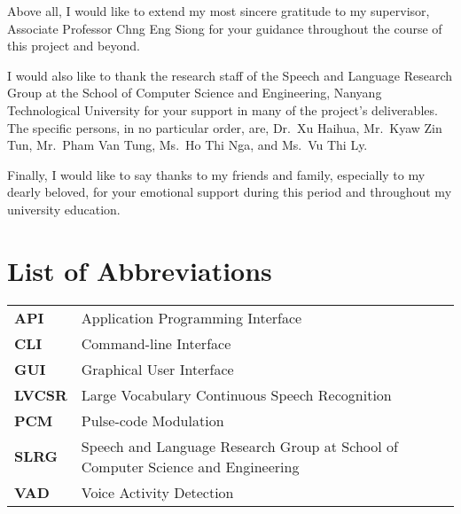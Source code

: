 Above all, I would like to extend my most sincere gratitude to my supervisor,
Associate Professor Chng Eng Siong for your guidance throughout
the course of this project and beyond.

I would also like to thank the research staff of the Speech
and Language Research Group at the School of Computer Science and Engineering,
Nanyang Technological University for your support in many of the project's
deliverables. The specific persons, in no particular order, are, Dr.\ Xu Haihua,
Mr.\ Kyaw Zin Tun, Mr.\ Pham Van Tung, Ms.\ Ho Thi Nga, and Ms.\ Vu Thi Ly.

Finally, I would like to say thanks to my friends and family, especially to my
dearly beloved, for your emotional support during this period and throughout my
university education.
\newpage

\tableofcontents
\newpage

\listoffigures
\newpage

\listoftables
\newpage

\chapter*{List of Abbreviations}
\begin{tabu}{lX}
    \textbf{API} & Application Programming Interface \\
    \textbf{CLI} & Command-line Interface \\
    \textbf{GUI} & Graphical User Interface \\
    \textbf{LVCSR} & Large Vocabulary Continuous Speech Recognition \\
    \textbf{PCM} & Pulse-code Modulation \\
    \textbf{SLRG} & Speech and Language Research Group at School of Computer
    Science and Engineering \\
    \textbf{VAD} & Voice Activity Detection
\end{tabu}
\newpage
